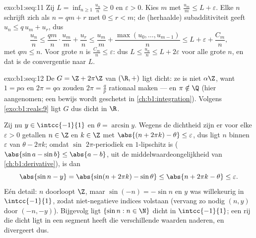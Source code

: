 \begin{solution}{exo:b1:seq:11}
Zij $L = \inf_{n \geq 1} \frac{u_n}{n} \geq 0$ en $\varepsilon > 0$. Kies
$m$ met $\frac{u_m}{m} \leq L + \varepsilon$. Elke $n$ schrijft zich als
$n = qm + r$ met $0 \leq r < m$; de (herhaalde) subadditiviteit geeft
$u_n \leq q\,u_m + u_r$, dus
\[
\frac{u_n}{n} \leq \frac{q m}{n}\cdot\frac{u_m}{m} + \frac{u_r}{n}
\leq \frac{u_m}{m} + \frac{\max(u_0, \dots, u_{m-1})}{n}
\leq L + \varepsilon + \frac{C_m}{n},
\]
met $qm \leq n$. Voor grote $n$ is $\frac{C_m}{n} \leq \varepsilon$: dus
$L \leq \frac{u_n}{n} \leq L + 2\varepsilon$ voor alle grote $n$, en dat
is de convergentie naar $L$.
\end{solution}

\begin{solution}{exo:b1:seq:12}
De  $G = \Z + 2\pi\Z$ van $(\R, +)$ ligt dicht: ze is niet
$\alpha\Z$, want $1 = p\alpha$ en $2\pi = q\alpha$ zouden $2\pi = \frac
qp$ rationaal maken --- en $\pi \notin \Q$ (hier aangenomen; een bewijs
wordt geschetst in \cref{ch:b1:integration}). Volgens
\cref{exo:b1:reals:9} ligt $G$ dus dicht in $\R$.

Zij nu $y \in \intcc{-1}{1}$ en $\theta = \arcsin y$. Wegens de dichtheid
zijn er voor elke $\varepsilon > 0$ getallen $n \in \Z$ en $k \in \Z$ met
$\abs{(n + 2\pi k) - \theta} \leq \varepsilon$, dus ligt $n$ binnen
$\varepsilon$ van $\theta - 2\pi k$; omdat $\sin$ $2\pi$-periodiek en
$1$-lipschitz is ($\abs{\sin a - \sin b} \leq \abs{a - b}$, uit de
middelwaardeongelijkheid van \cref{ch:b1:derivative}), is dan
\[
\abs{\sin n - y} = \abs{\sin(n + 2\pi k) - \sin\theta}
\leq \abs{n + 2\pi k - \theta} \leq \varepsilon .
\]
Eén detail: $n$ doorloopt $\Z$, maar $\sin(-n) = -\sin n$ en $y$ was
willekeurig in $\intcc{-1}{1}$, zodat niet-negatieve indices volstaan
(vervang zo nodig $(n, y)$ door $(-n, -y)$). Bijgevolg ligt $\{\sin n : n
\in \N\}$ dicht in $\intcc{-1}{1}$; een rij die dicht ligt in een segment
heeft  die verschillende waarden naderen, en divergeert dus.
\end{solution}


